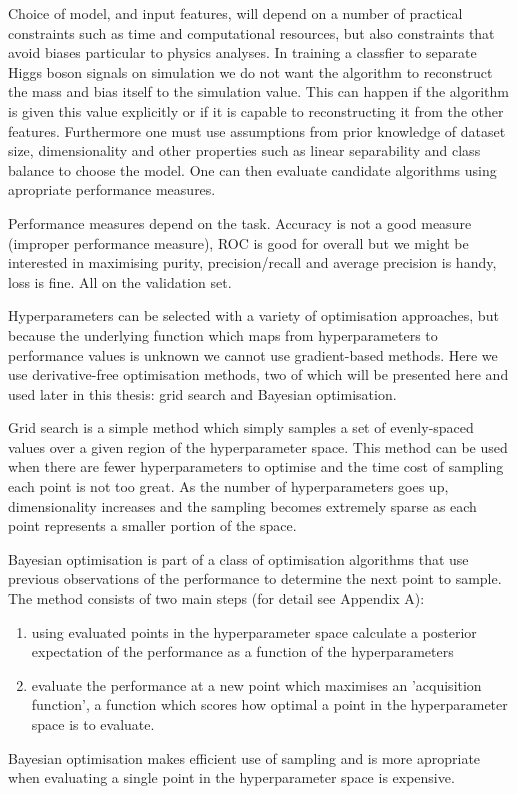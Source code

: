 Choice of model, and input features, will depend on a number of practical constraints such as time and computational resources, but also constraints that avoid biases particular to physics analyses. 
In training a classfier to separate Higgs boson signals on simulation we do not want the algorithm to reconstruct the mass and bias itself to the simulation value. This can happen if the algorithm is given this value explicitly or if it is capable to reconstructing it from the other features.  
Furthermore one must use assumptions from prior knowledge of dataset size, dimensionality and other properties such as linear separability and class balance to choose the model. One can then evaluate candidate algorithms using apropriate performance measures. 


Performance measures depend on the task.
Accuracy is not a good measure (improper performance measure), ROC is good for overall but we might be interested in maximising purity, precision/recall and average precision is handy, loss is fine. 
All on the validation set. 

Hyperparameters can be selected with a variety of optimisation approaches, but because the underlying function which maps from hyperparameters to performance values is unknown we cannot use gradient-based methods. Here we use derivative-free optimisation methods, two of which will be presented here and used later in this thesis: grid search and Bayesian optimisation.

Grid search is a simple method which simply samples a set of evenly-spaced values over a given region of the hyperparameter space. 
This method can be used when there are fewer hyperparameters to optimise and the time cost of sampling each point is not too great. 
As the number of hyperparameters goes up, dimensionality increases and the sampling becomes extremely sparse as each point represents a smaller portion of the space.

Bayesian optimisation is part of a class of optimisation algorithms that use previous observations of the performance to determine the next point to sample. 
The method consists of two main steps (for detail see Appendix A):
\begin{enumerate}[leftmargin=.5in,noitemsep]
    \item using evaluated points in the hyperparameter space calculate a posterior expectation of the performance as a function of the hyperparameters
    \item evaluate the performance at a new point which maximises an 'acquisition function', a function which scores how optimal a point in the hyperparameter space is to evaluate. 
\end{enumerate}
Bayesian optimisation makes efficient use of sampling and is more apropriate when evaluating a single point in the hyperparameter space is expensive. 

